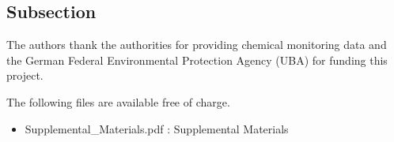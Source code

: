 \documentclass[journal=esthag,manuscript=article]{achemso}
\begin{document}



\subsection{Subsection}






\begin{acknowledgement}
The authors thank the authorities for providing chemical monitoring data and the German Federal Environmental Protection Agency (UBA) for funding this project.
\end{acknowledgement}


\begin{suppinfo}
The following files are available free of charge.
\begin{itemize}
  \item Supplemental\_Materials.pdf : Supplemental Materials
\end{itemize}
\end{suppinfo}




\end{document}
